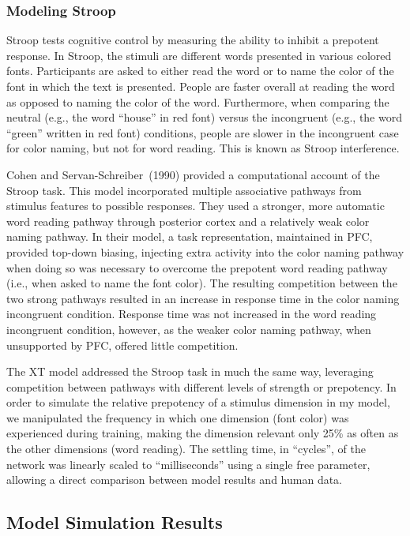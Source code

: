 \subsubsection{Modeling Stroop} 

Stroop tests cognitive control by measuring the ability to inhibit a prepotent response.  In Stroop, the stimuli are different words presented in various colored fonts.  Participants are asked to either read the word or to name the color of the font in which the text is presented.  People are faster overall at reading the word as opposed to naming the color of the word.  Furthermore, when comparing the neutral (e.g., the word ``house'' in red font) versus the incongruent (e.g., the word ``green'' written in red font) conditions, people are slower in the incongruent case for color naming, but not for word reading.  This is known as Stroop interference.

Cohen and Servan-Schreiber~(1990)\nocite{CohenJD:1990:Stroop} provided a computational account of the Stroop task. This model incorporated multiple associative pathways from stimulus features to possible responses.  They used a stronger, more automatic word reading pathway through posterior cortex and a relatively weak color naming pathway.  In their model, a task representation, maintained in PFC, provided top-down biasing, injecting extra activity into the color naming pathway when doing so was necessary to overcome the prepotent word reading pathway (i.e., when asked to name the font color).  The resulting competition between the two strong pathways resulted in an increase in response time in the color naming incongruent condition.  Response time was not increased in the word reading incongruent condition, however, as the weaker color naming pathway, when unsupported by PFC, offered little competition.

The XT model addressed the Stroop task in much the same way, leveraging competition between pathways with different levels of strength or prepotency.  In order to simulate the relative prepotency of a stimulus dimension in my model, we manipulated the frequency in which one dimension (font color) was experienced during training, making the dimension relevant only 25\% as often as the other dimensions (word reading).  The settling time, in ``cycles'', of the network was linearly scaled to ``milliseconds'' using a single free parameter, allowing a direct comparison between model results and human data.

\subsection{Model Simulation Results}

